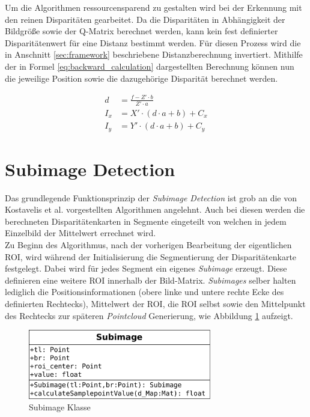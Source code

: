 \noindent
Um die Algorithmen ressourcensparend zu gestalten wird bei der Erkennung mit den reinen Disparitäten gearbeitet. Da die Disparitäten in Abhängigkeit der Bildgröße sowie der Q-Matrix berechnet werden, kann kein fest definierter Disparitätenwert für eine Distanz bestimmt werden. Für diesen Prozess wird die in Anschnitt \ref{sec:framework} beschriebene Distanzberechnung invertiert. Mithilfe der in Formel \ref{eq:backward_calculation} dargestellten Berechnung können nun die jeweilige Position sowie die dazugehörige Disparität berechnet werden. 

\begin{equation}
  \label{eq:backward_calculation}
  \begin{aligned}
    d &= \frac{f- Z' \cdot b}{Z' \cdot a}\\
    I_x &= X' \cdot (d \cdot a + b) + C_x\\
    I_y &= Y' \cdot (d \cdot a + b) + C_y
  \end{aligned}
\end{equation}


\section{Subimage Detection}
\label{sec:mean_disparity_detection}

Das grundlegende Funktionsprinzip der \emph{Subimage Detection} ist grob an die von Kostavelis et al. vorgestellten Algorithmen angelehnt. Auch bei diesen werden die berechneten Disparitätenkarten in Segmente eingeteilt von welchen in jedem Einzelbild der Mittelwert errechnet wird.\\

\noindent
Zu Beginn des Algorithmus, nach der vorherigen Bearbeitung der eigentlichen ROI, wird während der Initialisierung die Segmentierung der Disparitätenkarte festgelegt. Dabei wird für jedes Segment ein eigenes \emph{Subimage} erzeugt. Diese definieren eine weitere ROI innerhalb der Bild-Matrix. \emph{Subimages} selber halten lediglich die Positionsinformationen (obere linke und untere rechte Ecke des definierten Rechtecks), Mittelwert der ROI, die ROI selbst sowie den Mittelpunkt des Rechtecks zur späteren \emph{Pointcloud} Generierung, wie Abbildung \ref{fig:subimage_class} aufzeigt.\\

\begin{figure}[h]
	\begin{center}
		\includegraphics[width=8cm]{img/subimage_class}
	\end{center}
	\caption{Subimage Klasse}
	\label{fig:subimage_class}
\end{figure}

